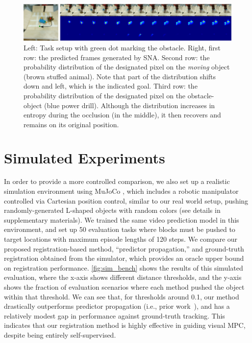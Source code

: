 \begin{figure}
	\centering
	\includegraphics[width=1\linewidth]{images_sna/multiobject_qualitative/avoid_obstacle.pdf}
	\caption{Left: Task setup with green dot marking the obstacle. Right, first row: the predicted frames generated by SNA. Second row: the probability distribution of the designated pixel on the \textit{moving} object (brown stuffed animal). Note that part of the distribution shifts down and left, which is the indicated goal. Third row: the probability distribution of the designated pixel on the obstacle-object (blue power drill). Although the distribution increases in entropy during the occlusion (in the middle), it then recovers and remains on its original position.
		\label{fig:goingaroundocclusion}}
\end{figure}


\section{Simulated Experiments}

In order to provide a more controlled comparison, we also set up a realistic simulation environment using MuJoCo \cite{todorov2012mujoco}, which includes a robotic manipulator controlled via Cartesian position control, similar to our real world setup, pushing randomly-generated L-shaped objects with random colors (see details in supplementary materials). 
We trained the same video prediction model in this environment, and set up 50 evaluation tasks where blocks must be pushed to target locations with maximum episode lengths of 120 steps. 
We  compare our proposed registration-based method, ``predictor propagation,'' and ground-truth registration obtained from the simulator, which provides an oracle upper bound on registration performance. \autoref{fig:sim_bench} shows the results of this simulated evaluation, where the x-axis shows different distance thresholds, and the y-axis shows the fraction of evaluation scenarios where each method pushed the object within that threshold. We can see that, for thresholds around 0.1, our method drastically outperforms predictor propagation (i.e., prior work~\cite{sna}), and has a relatively modest gap in performance against ground-truth tracking. This indicates that our registration method is highly effective in guiding visual MPC, despite being entirely self-supervised.




